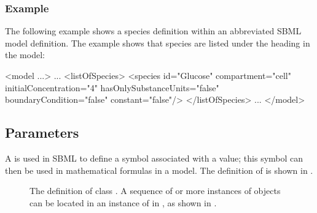 \subsubsection{Example}

The following example shows a species definition within an
abbreviated SBML model definition.  The example shows that species
are listed under the heading  in the model:

\begin{example}
<model ...>
    ...
    <listOfSpecies>
        <species id="Glucose" compartment="cell" initialConcentration="4"
                 hasOnlySubstanceUnits="false" boundaryCondition="false" constant="false"/>
    </listOfSpecies>
    ...
</model>
\end{example}


\subsection{Parameters}
\label{sec:parameters}

A \Parameter is used in SBML to define a symbol associated with a
value; this symbol can then be used in mathematical formulas in a
model. The definition of
\Parameter is shown in .

\begin{figure}[htb]
  \vertwo{\vspace*{-1ex}}
  \verone{\vspace*{2ex}}
  \centering
  \small
  \caption{The definition of class \Parameter.  A
      sequence of  or more instances of \Parameter objects can
      be located in an instance of \ListOfParameters in \Model, as
      shown in \protect{}.}
  \label{fig:parameter}
\end{figure}

